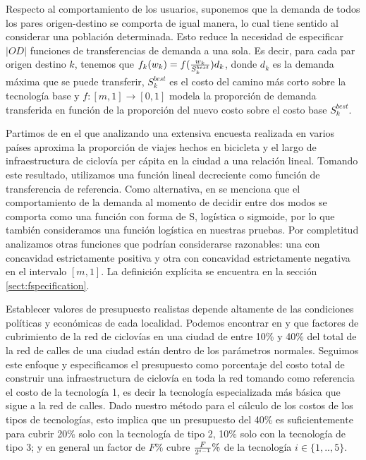 \documentclass{article}
\begin{document}
  Respecto al comportamiento de los usuarios, suponemos que la demanda de todos los pares origen-destino se comporta de igual manera, lo cual tiene sentido al considerar una población determinada. Esto reduce la necesidad de especificar $|OD|$ funciones de transferencias de demanda a una sola. Es decir, para cada par origen destino $k$, tenemos que $f_k(w_k) = f({w_k \over S^{best}_k})d_k$, donde $d_k$ es la demanda máxima que se puede transferir, $S^{best}_k$ es el costo del camino más corto sobre la tecnología base y $f: [m, 1] \rightarrow [0, 1]$ modela la proporción de demanda transferida en función de la proporción del nuevo costo sobre el costo base $S^{best}_k$.

  Partimos de \cite{shwe2014} en el que analizando una extensiva encuesta realizada en varios países aproxima la proporción de viajes hechos en bicicleta y el largo de infraestructura de ciclovía per cápita en la ciudad a una relación lineal. Tomando este resultado, utilizamos una función lineal decreciente como función de transferencia de referencia. Como alternativa, en \cite{ortuz2011} se menciona que el comportamiento de la demanda al momento de decidir entre dos modos se comporta como una función con forma de S, logística o sigmoide, por lo que también consideramos una función logística en nuestras pruebas. Por completitud analizamos otras funciones que podrían considerarse razonables: una con concavidad estrictamente positiva y otra con concavidad estrictamente negativa en el intervalo $[m, 1]$. La definición explícita se encuentra en la sección \ref{sect:fspecification}.

  Establecer valores de presupuesto realistas depende altamente de las condiciones políticas y económicas de cada localidad. Podemos encontrar en \cite{rios2015} y \cite{shwe2014} que factores de cubrimiento de la red de ciclovías en una ciudad de entre 10\% y 40\% del total de la red de calles de una ciudad están dentro de los parámetros normales. Seguimos este enfoque y especificamos el presupuesto como porcentaje del costo total de construir una infraestructura de ciclovía en toda la red tomando como referencia el costo de la tecnología 1, es decir la tecnología especializada más básica que sigue a la red de calles. Dado nuestro método para el cálculo de los costos de los tipos de tecnologías, esto implica que un presupuesto del 40\% es suficientemente para cubrir 20\% solo con la tecnología de tipo 2, 10\% solo con la tecnología de tipo 3; y en general un factor de $F\%$ cubre ${F \over {2^{i - 1}}}\%$ de la tecnología $i \in \{1,..,5\}$.
\end{document}
